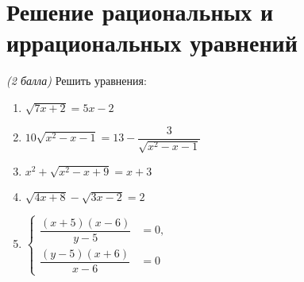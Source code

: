 \documentclass[12pt, a5paper]{article}
\begin{document}
		

\section*{Решение рациональных и иррациональных уравнений}
\textit{(2 балла)} Решить уравнения:
	\begin{enumerate}
		\item $\sqrt{7x+2}=5x-2$
		\item $10\sqrt{x^2-x-1}=13-\dfrac{3}{\sqrt{x^2-x-1}}$
		\item $x^2+\sqrt{x^2-x+9}=x+3$
		\item $\sqrt{4x+8}-\sqrt{3x-2}=2$
		\item $\left\{
		\begin{aligned}
			\dfrac{(x+5)(x-6)}{y-5}&=0,\\
			\dfrac{(y-5)(x+6)}{x-6}&=0
		\end{aligned}
		\right.$
		
	\end{enumerate}
\end{document}
